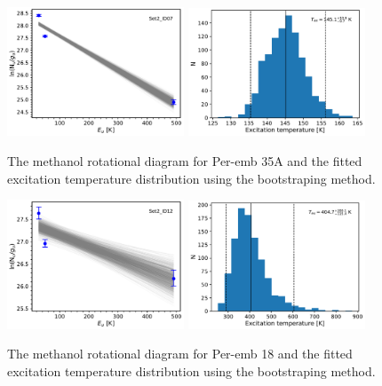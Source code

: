 \documentclass[twocolumn]{aastex62}
\begin{document}
\begin{figure}[htbp!]
  \centering
  \includegraphics[width=0.47\textwidth]{Set2_ID07.pdf}
  \includegraphics[width=0.47\textwidth]{Set2_ID07_rot_temps.pdf}
  \caption{The methanol rotational diagram for Per-emb 35A and the fitted excitation temperature distribution using the bootstraping method.}
  \label{}
\end{figure}

\begin{figure}[htbp!]
  \centering
  \includegraphics[width=0.47\textwidth]{Set2_ID12.pdf}
  \includegraphics[width=0.47\textwidth]{Set2_ID12_rot_temps.pdf}
  \caption{The methanol rotational diagram for Per-emb 18 and the fitted excitation temperature distribution using the bootstraping method.}
  \label{}
\end{figure}
\end{document}

